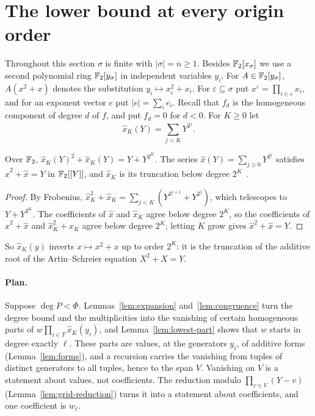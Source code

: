 \section{The lower bound at every origin order}\label{sec:lower}

Throughout this section \(\sigma\) is finite with \(|\sigma|=n\ge1\). Besides
\(\mathbb F_2[x_\sigma]\) we use a second polynomial ring \(\mathbb F_2[y_\sigma]\) in independent
variables \(y_i\). For \(A\in\mathbb F_2[y_\sigma]\), \(A(x^2+x)\) denotes the substitution
\(y_i\mapsto x_i^2+x_i\). For \(\varepsilon\subseteq\sigma\) put
\(x^\varepsilon=\prod_{i\in\varepsilon}x_i\), and for an exponent vector \(e\) put
\(|e|=\sum_ie_i\). Recall that \(f_d\) is the homogeneous component of degree
\(d\) of \(f\), and put \(f_d=0\) for \(d<0\). For \(K\ge0\) let
\[
 \hat x_K(Y)=\sum_{j<K}Y^{2^j}.
\]

\begin{lemma}\label{lem:local-inverse}
Over \(\mathbb F_2\), \(\hat x_K(Y)^2+\hat x_K(Y)=Y+Y^{2^K}\). The series
\(\hat x(Y)=\sum_{j\ge0}Y^{2^j}\) satisfies \(\hat x^2+\hat x=Y\) in \(\mathbb F_2[[Y]]\), and
\(\hat x_K\) is its truncation below degree \(2^K\)
\textnormal{\small{}\,}.
\end{lemma}

\begin{proof}
By Frobenius, \(\hat x_K^2+\hat x_K=\sum_{j<K}(Y^{2^{j+1}}+Y^{2^j})\), which
telescopes to \(Y+Y^{2^K}\). The
coefficients of \(\hat x\) and \(\hat x_K\) agree below degree \(2^K\), so the
coefficients of \(\hat x^2+\hat x\) and \(\hat x_K^2+\hat x_K\) agree below degree
\(2^K\); letting \(K\) grow gives \(\hat x^2+\hat x=Y\).
\end{proof}

So \(\hat x_K(y)\) inverts \(x\mapsto x^2+x\) up to order \(2^K\): it is the
truncation of the additive root of the Artin--Schreier equation \(X^2+X=Y\).

\paragraph{Plan.} Suppose \(\deg P<\Phi\). Lemmas~\ref{lem:expansion}
and~\ref{lem:congruence} turn the degree bound and the multiplicities into the
vanishing of certain homogeneous parts of \(w\prod_{i\in T}\hat x_K(y_i)\), and
Lemma~\ref{lem:lowest-part} shows that \(w\) starts in degree exactly \(\ell\).
These parts are values, at the generators \(y_i\), of additive forms
(Lemma~\ref{lem:forms}), and a recursion carries the vanishing from tuples of
distinct generators to all tuples, hence to the span \(V\). Vanishing on \(V\) is
a statement about values, not coefficients. The reduction modulo
\(\prod_{v\in V}(Y-v)\) (Lemma~\ref{lem:grid-reduction}) turns it into a
statement about coefficients, and one coefficient is \(w_\ell\).

